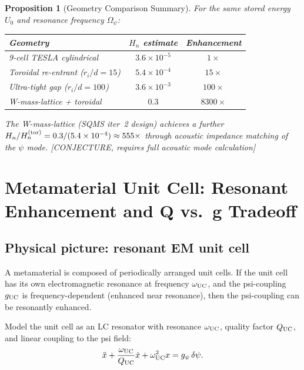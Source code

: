 \documentclass[11pt,twocolumn]{article}
\newcommand{\dpsi}{\delta\psi}
\newcommand{\Opsi}{\Omega_\psi}
\newcommand{\ee}[1]{\times 10^{#1}}
\newtheorem{proposition}[theorem]{Proposition}
\theoremstyle{definition}
\theoremstyle{remark}
\begin{document}
\begin{proposition}[Geometry Comparison Summary]
\label{prop:geometry}
For the same stored energy $U_0$ and resonance frequency $\Opsi$:
\begin{center}
\begin{tabular}{lcc}
\toprule
Geometry & $H_n$ estimate & Enhancement \\
\midrule
9-cell TESLA cylindrical & $3.6\ee{-5}$ & $1\times$ \\
Toroidal re-entrant ($r_i/d = 15$) & $5.4\ee{-4}$ & $15\times$ \\
Ultra-tight gap ($r_i/d = 100$) & $3.6\ee{-3}$ & $100\times$ \\
W-mass-lattice + toroidal & $0.3$ & $8300\times$ \\
\bottomrule
\end{tabular}
\end{center}
The W-mass-lattice (SQMS iter~2 design) achieves a further
$H_n/H_n^{(\rm tor)} = 0.3/(5.4\ee{-4}) \approx 555\times$ through
acoustic impedance matching of the $\psi$ mode. [CONJECTURE, requires
full acoustic mode calculation]
\end{proposition}

\section{Metamaterial Unit Cell: Resonant Enhancement and Q vs.\ g Tradeoff}
\label{sec:metamaterial}

\subsection{Physical picture: resonant EM unit cell}
\label{sec:UC_physics}

A metamaterial is composed of periodically arranged unit cells.  If the
unit cell has its own electromagnetic resonance at frequency $\omega_{\rm UC}$,
and the psi-coupling $g_{\rm UC}$ is frequency-dependent (enhanced near
resonance), then the psi-coupling can be resonantly enhanced.

Model the unit cell as an LC resonator with resonance $\omega_{\rm UC}$,
quality factor $Q_{\rm UC}$, and linear coupling to the psi field:
\begin{equation}
\ddot{x} + \frac{\omega_{\rm UC}}{Q_{\rm UC}}\dot{x} + \omega_{\rm UC}^2 x
= g_\psi\,\dpsi.
\label{eq:UC_EOM}
\end{equation}
\end{document}
